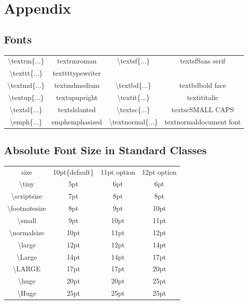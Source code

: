 \documentclass[11pt]{article}
\begin{document}
\section{Appendix}
\subsection{Fonts}
\begin{table}[!ht]
	\begin{center}
		\begin{tabular}{cccc}
			\hline
			\textbackslash textrm\{...\}&textrm{roman}&\textbackslash textsf\{...\}&textsf{Sans serif}\\
			
			\textbackslash texttt\{...\}&texttt{typewriter}&&\\
			
			\textbackslash textmd\{...\}&textmd{medium}&\textbackslash textbd\{...\}&textbd{bold face}\\
			
			\textbackslash textup\{...\}&textup{upright}&\textbackslash textit\{...\}&textit{italic}\\
			
			\textbackslash textsl\{...\}&textsl{slanted}&\textbackslash textsc\{...\}&textsc{SMALL CAPS}\\
			
			\textbackslash emph\{...\}&emph{emphasized}&\textbackslash textnormal\{...\}&textnormal{document font}\\
			
			
			\hline
		\end{tabular}
		\label{Fonts}
	\end{center}
\end{table}

\subsection{Absolute Font Size in Standard Classes}
\begin{table}[!ht]
	\begin{center}
		\begin{tabular}{cccc}
			\hline
			size&10pt\{default\}&11pt option&12pt option\\
			\textbackslash tiny&5pt&6pt&6pt\\
			\textbackslash scriptsize&7pt&8pt&8pt\\
			\textbackslash footnotesize&8pt&9pt&10pt\\
			\textbackslash small&9pt&10pt&11pt\\
			\textbackslash normalsize&10pt&11pt&12pt\\
			\textbackslash large&12pt&12pt&14pt\\
			\textbackslash Large&14pt&14pt&17pt\\
			\textbackslash LARGE&17pt&17pt&20pt\\
			\textbackslash huge&20pt&20pt&25pt\\
			\textbackslash Huge&25pt&25pt&25pt\\
			\hline	
		\end{tabular}
		\label{Fonts and its Sizes}
	\end{center}
\end{table}
\end{document}
